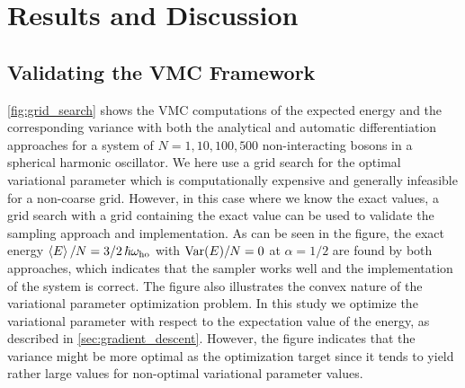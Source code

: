 \newpage
\section{Results and Discussion}\label{sec:Results}

\subsection{Validating the VMC Framework}\label{sec:project results}

\autoref{fig:grid_search} shows the VMC computations of the expected energy and the corresponding variance with both the analytical and automatic differentiation approaches for a system of $N=1, 10, 100, 500$ non-interacting bosons in a spherical harmonic oscillator. We here use a grid search for the optimal variational parameter which is computationally expensive and generally infeasible for a non-coarse grid. However, in this case where we know the exact values, a grid search with a grid containing the exact value can be used to validate the sampling approach and implementation. As can be seen in the figure, the exact energy $\expval{E}/N = 3/2 \, \hbar \omega_\mathrm{ho}$ with $\mathrm{Var} \qty(E) / N = 0$ at $\alpha=1/2$ are found by both approaches, which indicates that the sampler works well and the implementation of the system is correct. The figure also illustrates the convex nature of the variational parameter optimization problem. In this study we optimize the variational parameter with respect to the expectation value of the energy, as described in \autoref{sec:gradient_descent}. However, the figure indicates that the variance might be more optimal as the optimization target since it tends to yield rather large values for non-optimal variational parameter values. 


